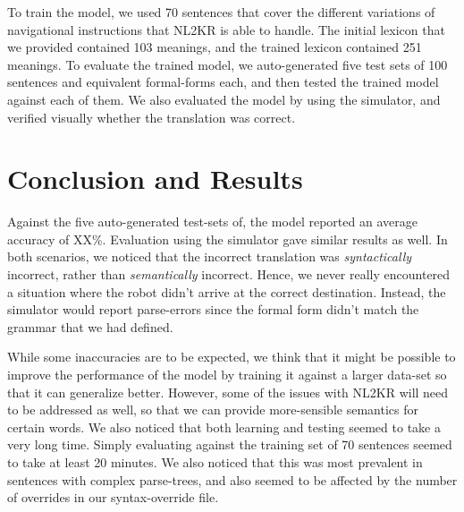\documentclass[11pt,letterpaper]{article}
\begin{document}
To train the model, we used 70 sentences that cover the different variations of navigational instructions that NL2KR is able to handle. The initial  lexicon that we provided contained 103 meanings, and the trained lexicon contained 251 meanings. To evaluate the trained model, we auto-generated five test sets of 100 sentences and equivalent formal-forms each, and then tested the trained model against each of them. We also evaluated the model by using the simulator, and verified visually whether the translation was correct.

\section{Conclusion and Results}

Against the five auto-generated test-sets of, the model reported an average accuracy of XX\%. Evaluation using the simulator gave similar results as well. In both scenarios, we noticed that the incorrect translation was \textit{syntactically} incorrect, rather than \textit{semantically} incorrect. Hence, we never really encountered a situation where the robot didn't arrive at the correct destination. Instead, the simulator would report parse-errors since the formal form didn't match the grammar that we had defined.

While some inaccuracies are to be expected, we think that it might be possible to improve the performance of the model by training it against a larger data-set so that it can generalize better. However, some of the issues with NL2KR will need to be addressed as well, so that we can provide more-sensible semantics for certain words. We also noticed that both learning and testing seemed to take a very long time. Simply evaluating against the training set of 70 sentences seemed to take at least 20 minutes. We also noticed that this was most prevalent in sentences with complex parse-trees, and also seemed to be affected by the number of overrides in our syntax-override file.
\end{document}
